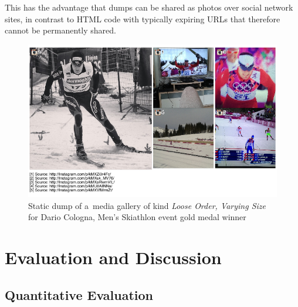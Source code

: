 \documentclass{sig-alternate}
\begin{document}
This has the advantage that dumps
can be shared as photos over social network sites,
in contrast to  HTML code with typically expiring URLs
that therefore cannot be permanently shared.

\begin{figure}
  \centering
  \includegraphics[width=1.0\columnwidth]{figures/dario_cologna/mediagallery_looseOrder_1391945454845.png}
  \caption{Static dump of a~media gallery of kind \emph{Loose Order, Varying Size}
  for Dario Cologna, Men's Skiathlon event gold medal winner}
  \label{fig:dario-cologna}    
\end{figure}


\section{Evaluation and Discussion}
\label{sec:evaluation-and-discussion}
\selectfont

\subsection{Quantitative Evaluation}
\end{document}
